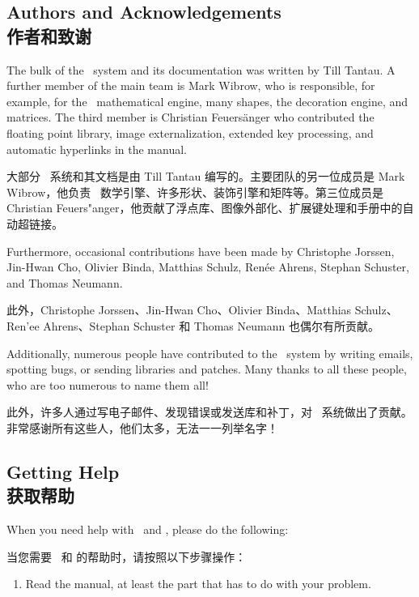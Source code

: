 \begin{paracol}{2}
\subsection{Authors and Acknowledgements\\作者和致谢}
\label{section-authors}

The bulk of the \pgfname\ system and its documentation was written by Till
Tantau. A further member of the main team is Mark Wibrow, who is responsible,
for example, for the \pgfname\ mathematical engine, many shapes, the decoration
engine, and matrices. The third member is Christian Feuers\"anger who
contributed the floating point library, image externalization, extended key
processing, and automatic hyperlinks in the manual.

大部分 \pgfname\ 系统和其文档是由 Till Tantau 编写的。主要团队的另一位成员是 Mark Wibrow，他负责 \pgfname\ 数学引擎、许多形状、装饰引擎和矩阵等。第三位成员是 Christian Feuers"anger，他贡献了浮点库、图像外部化、扩展键处理和手册中的自动超链接。

Furthermore, occasional contributions have been made by Christophe Jorssen,
Jin-Hwan Cho, Olivier Binda, Matthias Schulz, Ren\'ee Ahrens, Stephan Schuster,
and Thomas Neumann.

此外，Christophe Jorssen、Jin-Hwan Cho、Olivier Binda、Matthias Schulz、Ren'ee Ahrens、Stephan Schuster 和 Thomas Neumann 也偶尔有所贡献。


Additionally, numerous people have contributed to the \pgfname\ system by
writing emails, spotting bugs, or sending libraries and patches. Many thanks to
all these people, who are too numerous to name them all!

此外，许多人通过写电子邮件、发现错误或发送库和补丁，对 \pgfname\ 系统做出了贡献。非常感谢所有这些人，他们太多，无法一一列举名字！


\subsection{Getting Help\\获取帮助}

When you need help with \pgfname\ and \tikzname, please do the following:

当您需要 \pgfname\ 和 \tikzname 的帮助时，请按照以下步骤操作：


\begin{enumerate}
    \item Read the manual, at least the part that has to do with your
        problem.


\end{enumerate}
\end{paracol}
